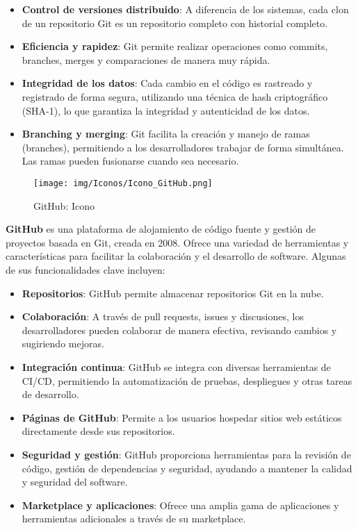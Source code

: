 \documentclass[a4paper, 12pt]{book}
\begin{document}
        \begin{itemize}
            \item \textbf{Control de versiones distribuido}: A diferencia de los sistemas, cada clon de un repositorio Git es un repositorio completo con historial completo.
            \item \textbf{Eficiencia y rapidez}: Git permite realizar operaciones como commits, branches, merges y comparaciones de manera muy rápida.
            \item \textbf{Integridad de los datos}: Cada cambio en el código es rastreado y registrado de forma segura, utilizando una técnica de hash criptográfico (SHA-1), lo que garantiza la integridad y autenticidad de los datos.
            \item \textbf{Branching y merging}: Git facilita la creación y manejo de ramas (branches), permitiendo a los desarrolladores trabajar de forma simultánea. Las ramas pueden fusionarse cuando sea necesario.
        \end{itemize}
    
        \begin{figure}[H]
            \centering
            \texttt{[image: img/Iconos/Icono\_GitHub.png]}
            \caption{GitHub: Icono}
            \label{fig:enter-label}
         \end{figure}
        
        \textbf{GitHub} es una plataforma de alojamiento de código fuente y gestión de proyectos basada en Git, creada en 2008. Ofrece una variedad de herramientas y características para facilitar la colaboración y el desarrollo de software. Algunas de sus funcionalidades clave incluyen:
    
        \begin{itemize}
            \item \textbf{Repositorios}: GitHub permite almacenar repositorios Git en la nube.
            \item \textbf{Colaboración}: A través de pull requests, issues y discusiones, los desarrolladores pueden colaborar de manera efectiva, revisando cambios y sugiriendo mejoras.
            \item \textbf{Integración continua}: GitHub se integra con diversas herramientas de CI/CD, permitiendo la automatización de pruebas, despliegues y otras tareas de desarrollo.
            \item \textbf{Páginas de GitHub}: Permite a los usuarios hospedar sitios web estáticos directamente desde sus repositorios.
            \item \textbf{Seguridad y gestión}: GitHub proporciona herramientas para la revisión de código, gestión de dependencias y seguridad, ayudando a mantener la calidad y seguridad del software.
            \item \textbf{Marketplace y aplicaciones}: Ofrece una amplia gama de aplicaciones y herramientas adicionales a través de su marketplace.
        \end{itemize}
    
\end{document}
